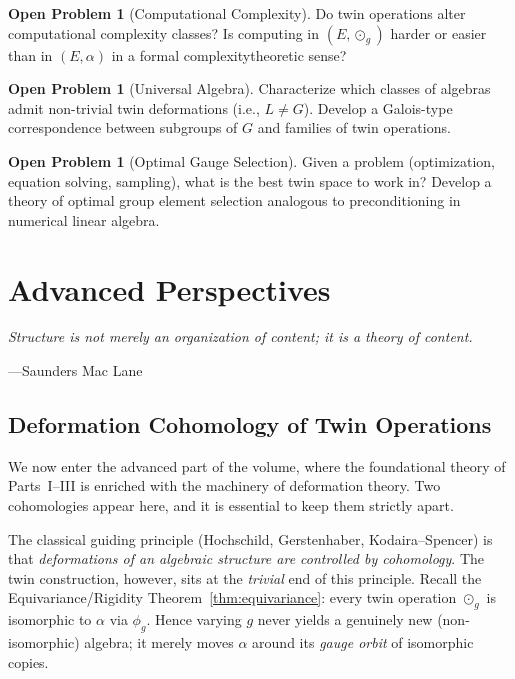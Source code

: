 \documentclass[11pt,a4paper,openany]{book}
\theoremstyle{plain}
\theoremstyle{definition}
\newtheorem{problem}[theorem]{Open Problem}
\newcommand{\twing}[1]{\odot_{#1}}
\newcommand{\lingroup}{L}
\newcommand{\actspace}{E}
\newcommand{\groupG}{G}
\begin{document}
\begin{problem}[Computational Complexity]
Do twin operations alter computational complexity classes? Is computing in $(\actspace, \twing{g})$ harder or easier than in $(\actspace, \alpha)$ in a formal complexity\-theoretic sense?
\end{problem}

\begin{problem}[Universal Algebra]
Characterize which classes of algebras admit non-trivial twin deformations (i.e., $\lingroup \neq \groupG$). Develop a Galois-type correspondence between subgroups of $\groupG$ and families of twin operations.
\end{problem}

\begin{problem}[Optimal Gauge Selection]
Given a problem (optimization, equation solving, sampling), what is the best twin space to work in? Develop a theory of optimal group element selection analogous to preconditioning in numerical linear algebra.
\end{problem}


\part{Advanced Perspectives}
\label{part:advanced}

\epigraph{\itshape Structure is not merely an organization of content; it is a theory of content.}{---Saunders Mac Lane}


\chapter{Deformation Cohomology of Twin Operations}
\label{ch:cohomology}

We now enter the advanced part of the volume, where the foundational theory of Parts~I--III is enriched with the machinery of deformation theory. Two cohomologies appear here, and it is essential to keep them strictly apart.

The classical guiding principle (Hochschild, Gerstenhaber, Kodaira--Spencer) is that \emph{deformations of an algebraic structure are controlled by cohomology}. The twin construction, however, sits at the \emph{trivial} end of this principle. Recall the Equivariance/Rigidity Theorem~\ref{thm:equivariance}: every twin operation $\twing{g}$ is isomorphic to $\alpha$ via $\phi_g$. Hence varying $g$ never yields a genuinely new (non-isomorphic) algebra; it merely moves $\alpha$ around its \emph{gauge orbit} of isomorphic copies.
\end{document}
